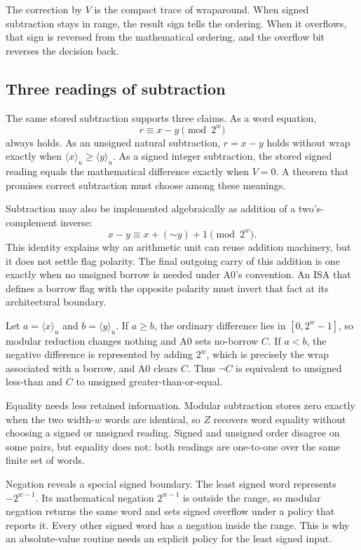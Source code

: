The correction by \(V\) is the compact trace of wraparound. When signed
subtraction stays in range, the result sign tells the ordering. When it
overflows, that sign is reversed from the mathematical ordering, and the
overflow bit reverses the decision back.

\subsection{Three readings of subtraction}

The same stored subtraction supports three claims. As a word equation,
\[
  r\equiv x-y\pmod{2^w}
\]
always holds. As an unsigned natural subtraction, \(r=x-y\) holds without
wrap exactly when \(\langle x\rangle_u\geq\langle y\rangle_u\). As a signed
integer subtraction, the stored signed reading equals the mathematical
difference exactly when \(V=0\). A theorem that promises correct subtraction
must choose among these meanings.

Subtraction may also be implemented algebraically as addition of a two's-
complement inverse:
\[
  x-y\equiv x+(\mathord{\sim}y)+1\pmod{2^w}.
\]
This identity explains why an arithmetic unit can reuse addition machinery,
but it does not settle flag polarity. The final outgoing carry of this addition is
one exactly when no unsigned borrow is needed under A0's convention. An ISA
that defines a borrow flag with the opposite polarity must invert that fact at
its architectural boundary.

\begin{proofkit}[title={Unsigned comparison from subtraction}]
Let \(a=\langle x\rangle_u\) and \(b=\langle y\rangle_u\). If \(a\geq b\),
the ordinary difference lies in \([0,2^w-1]\), so modular reduction changes
nothing and A0 sets no-borrow \(C\). If \(a<b\), the negative difference is
represented by adding \(2^w\), which is precisely the wrap associated with a
borrow, and A0 clears \(C\). Thus \(\neg C\) is equivalent to unsigned
less-than and \(C\) to unsigned greater-than-or-equal.
\end{proofkit}

Equality needs less retained information. Modular subtraction stores zero
exactly when the two width-\(w\) words are identical, so \(Z\) recovers word
equality without choosing a signed or unsigned reading. Signed and unsigned order disagree on
some pairs, but equality does not: both readings are one-to-one over the same
finite set of words.

Negation reveals a special signed boundary. The least signed word represents
\(-2^{w-1}\). Its mathematical negation \(2^{w-1}\) is outside the range, so
modular negation returns the same word and sets signed overflow under a policy
that reports it. Every other signed word has a negation inside the range. This is
why an absolute-value routine needs an explicit policy for the least signed
input.

